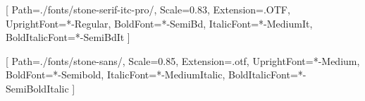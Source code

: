 \usepackage{microtype}
\usepackage{setspace}

\setlength{\parskip}{0em}
\setlength{\parindent}{1em}
\linespread{1}

\newcommand{\titleoriginal}{The Sovereign Individual}
\newcommand{\subtitleoriginal}{Mastering the Transition to the Information Age}
\newcommand{\yearoriginal}{2023}
\newcommand{\subtitletranslation}{Der Übergang zum Informationszeitalter}
\newcommand{\yeartranslation}{2024}
\newcommand{\stringtranslation}{Übersetzung}
\newcommand{\stringlicense}{Alle Rechte vorbehalten.}
\newcommand{\stringpublisher}{Verlag}
\newcommand{\ISBNHC}{978-9916-749-25-8}
\newcommand{\ISBNSC}{978-9916-749-26-5}
\newcommand{\ISBNEBOOK}{978-9916-749-27-2}
\newcommand{\ISBNAUDIO}{978-9916-749-29-6}
\newcommand{\press}{Konsensus Network}
\newcommand{\translatorone}{Andreas Tank}
\newcommand{\translators}{
\large\textit{\stringtranslation:}\\
\translatorone\\
}

\setstocksize{210mm}{148mm}
\settrimmedsize{210mm}{148mm}{*}
\setbinding{7mm}
\setlrmarginsandblock{15mm}{15mm}{*}
\setulmarginsandblock{15mm}{16mm}{*}
\setlength{\skip\footins}{20pt} %

\usepackage{fontspec}
\setmainfont{stone-serif}[
    Path=./fonts/stone-serif-itc-pro/,
    Scale=0.83,
    Extension=.OTF,
    UprightFont=*-Regular,
    BoldFont=*-SemiBd,
    ItalicFont=*-MediumIt,
    BoldItalicFont=*-SemiBdIt
    ]

\setsansfont{stone-sans}[
    Path=./fonts/stone-sans/,
    Scale=0.85,
    Extension=.otf,
    UprightFont=*-Medium,
    BoldFont=*-Semibold,
    ItalicFont=*-MediumItalic,
    BoldItalicFont=*-SemiBoldItalic
    ]

\usepackage{lettrine}
\setcounter{DefaultLines}{3}
\renewcommand{\DefaultLoversize}{0.1}
\renewcommand{\DefaultLraise}{0}
\renewcommand{\LettrineTextFont}{}
\setlength{\DefaultFindent}{\fontdimen2\font}
\setlength{\DefaultNindent}{0em}


\makeatletter
\newcommand*\halftitlepage{\begingroup %
  \setlength\drop{0.1\textheight}
  \begin{center}
  \vspace*{\drop}
  \rule{\textwidth}{0in}\par
  {\Large\sffamily\thetitle\par}
  \rule{\textwidth}{0in}\par
  \vfill
  \end{center}
\endgroup}
\makeatother

